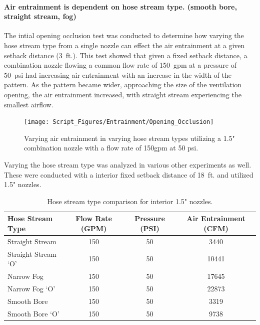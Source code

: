 \documentclass{article}
\begin{document}
\clearpage

\paragraph{Air entrainment is dependent on hose stream type. (smooth bore, straight stream, fog)} \mbox{}

The intial opening occlusion test was conducted to determine how varying the hose stream type from a single nozzle can effect the air entrainment at a given setback distance (3~ft.). This test showed that given a fixed setback distance, a combination nozzle flowing a common flow rate of 150~gpm at a pressure of 50~psi had increasing air entrainment with an increase in the width of the pattern. As the pattern became wider, approaching the size of the ventilation opening, the air entrainment increased, with straight stream experiencing the smallest airflow. 

\begin{figure}[!ht]
	\centering
	\texttt{[image: Script\_Figures/Entrainment/Opening\_Occlusion]}
	\caption{Varying air entrainment in varying hose stream types utilizing a 1.5" combination nozzle with a flow rate of 150gpm at 50 psi.}
	\label{fig:Opening_Occlusion}
\end{figure}

Varying the hose stream type was analyzed in various other experiments as well. These were conducted with a interior fixed setback distance of 18~ft. and utilized 1.5" nozzles.


\begin{table}[!ht]
\centering
\caption{Hose stream type comparison for interior 1.5" nozzles.}
\label{Hose_Stream_Type_Comparison}
\begin{tabular}{lccc}
\toprule[1.5pt]
Hose Stream Type & Flow Rate (GPM) & Pressure (PSI) & Air Entrainment (CFM) \\ 
\midrule
Straight Stream & 150 & 50 & 3440 \\
Straight Stream `O' & 150 & 50 & 10441 \\
Narrow Fog & 150 & 50 & 17645 \\
Narrow Fog `O' & 150 & 50 & 22873 \\
Smooth Bore & 150 & 50 & 3319 \\
Smooth Bore `O' & 150 & 50 & 9738 \\ 
\bottomrule[1.25pt]
\end{tabular}
\end{table}
\end{document}
